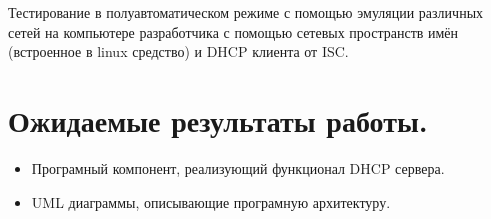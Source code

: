 \documentclass[12pt]{article}
\begin{document}
Тестирование в полуавтоматическом режиме с помощью эмуляции различных сетей на компьютере разработчика с помощью сетевых пространств имён (встроенное в linux средство) и DHCP клиента от ISC.

\section{Ожидаемые результаты работы.}
\begin{itemize}
    \item Програмный компонент, реализующий функционал DHCP сервера.
    \item UML диаграммы, описывающие програмную архитектуру.
\end{itemize}
\end{document}
